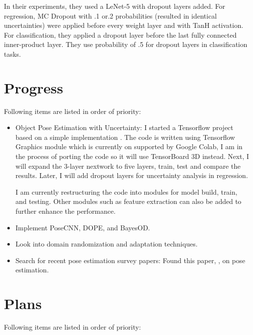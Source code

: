 \documentclass[11pt]{article}
\begin{document}
In their experiments, they used a LeNet-5 with dropout layers added. For
regression, MC Dropout with .1 or.2  probabilities (resulted in identical
uncertainties) were applied before every weight layer and with TanH activation.
For classification, they applied a dropout layer before the last fully connected
inner-product layer. They use probability of .5 for dropout layers in
classification tasks.


\section{Progress}
Following items are listed in order of priority:
\begin{itemize}
	\item Object Pose Estimation with Uncertainty: I started a Tensorflow
	      \cite{tensorflow2015-whitepaper} project based on a simple implementation
	      \cite{graphics85:online}. The code is written using Tensorflow Graphics
	      module which is currently on supported by Google Colab, I am in the
	      process of porting the code so it will use TensorBoard 3D instead.
	      Next, I will expand the 3-layer nextwork to five layers, train, test
	      and compare the results. Later, I will add dropout layers for uncertainty
	      analysis in regression.

	      I am currently restructuring the code into modules for model build, train,
	      and testing. Other modules such as feature extraction can also be added
	      to further enhance the performance.


	\item Implement PoseCNN, DOPE, and BayesOD.
	\item Look into domain randomization and adaptation techniques.
	\item Search for recent pose estimation survey papers: Found this paper,
	      \cite{du2020vision}, on pose estimation.

\end{itemize}


\section{Plans}
Following items are listed in order of priority:
\end{document}
